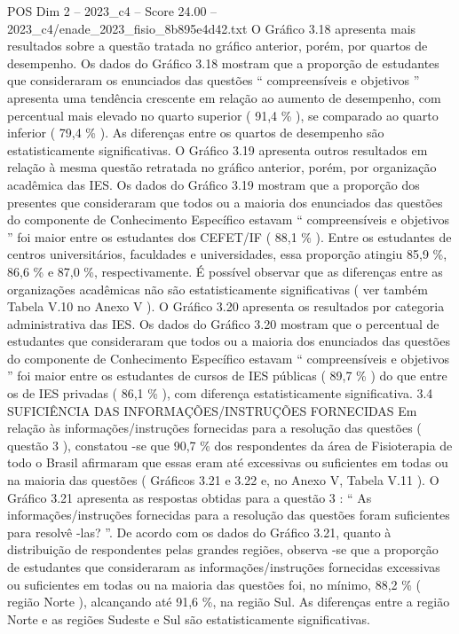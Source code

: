 \begin{textsample}{POS Dim 2 – 2023\_c4 – Score 24.00 – 2023\_c4/enade\_2023\_fisio\_8b895e4d42.txt}
O Gráfico 3.18 apresenta mais resultados sobre a questão tratada no gráfico anterior, porém, por quartos de desempenho.
Os dados do Gráfico 3.18 mostram que a proporção de estudantes que consideraram os enunciados das questões “ compreensíveis e objetivos ” apresenta uma tendência crescente em relação ao aumento de desempenho, com percentual mais elevado no quarto superior ( 91,4 \% ), se comparado ao quarto inferior ( 79,4 \% ).
As diferenças entre os quartos de desempenho são estatisticamente significativas.
O Gráfico 3.19 apresenta outros resultados em relação à mesma questão retratada no gráfico anterior, porém, por organização acadêmica das IES.
Os dados do Gráfico 3.19 mostram que a proporção dos presentes que consideraram que todos ou a maioria dos enunciados das questões do componente de Conhecimento Específico estavam “ compreensíveis e objetivos ” foi maior entre os estudantes dos CEFET/IF ( 88,1 \% ).
Entre os estudantes de centros universitários, faculdades e universidades, essa proporção atingiu 85,9 \%, 86,6 \% e 87,0 \%, respectivamente.
É possível observar que as diferenças entre as organizações acadêmicas não são estatisticamente significativas ( ver também Tabela V.10 no Anexo V ).
O Gráfico 3.20 apresenta os resultados por categoria administrativa das IES.
Os dados do Gráfico 3.20 mostram que o percentual de estudantes que consideraram que todos ou a maioria dos enunciados das questões do componente de Conhecimento Específico estavam “ compreensíveis e objetivos ” foi maior entre os estudantes de cursos de IES públicas ( 89,7 \% ) do que entre os de IES privadas ( 86,1 \% ), com diferença estatisticamente significativa. 3.4 SUFICIÊNCIA DAS INFORMAÇÕES/INSTRUÇÕES FORNECIDAS Em relação às informações/instruções fornecidas para a resolução das questões ( questão 3 ), constatou -se que 90,7 \% dos respondentes da área de Fisioterapia de todo o Brasil afirmaram que essas eram até excessivas ou suficientes em todas ou na maioria das questões ( Gráficos 3.21 e 3.22 e, no Anexo V, Tabela V.11 ).
O Gráfico 3.21 apresenta as respostas obtidas para a questão 3 : “ As informações/instruções fornecidas para a resolução das questões foram suficientes para resolvê -las? ”.
De acordo com os dados do Gráfico 3.21, quanto à distribuição de respondentes pelas grandes regiões, observa -se que a proporção de estudantes que consideraram as informações/instruções fornecidas excessivas ou suficientes em todas ou na maioria das questões foi, no mínimo, 88,2 \% ( região Norte ), alcançando até 91,6 \%, na região Sul.
As diferenças entre a região Norte e as regiões Sudeste e Sul são estatisticamente significativas.

\end{textsample}
